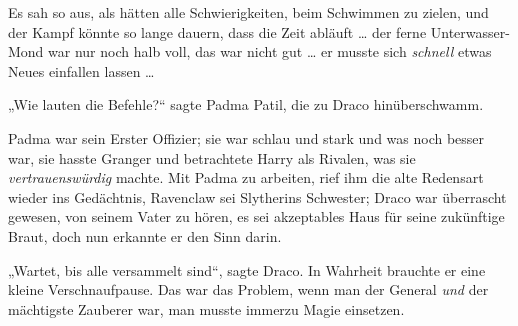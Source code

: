 Es sah so aus, als hätten alle Schwierigkeiten, beim Schwimmen zu zielen, und der Kampf könnte so lange dauern, dass die Zeit abläuft … der ferne Unterwasser-Mond war nur noch halb voll, das war nicht gut … er musste sich \emph{schnell} etwas Neues einfallen lassen …

„Wie lauten die Befehle?“ sagte Padma Patil, die zu Draco hinüberschwamm.

Padma war sein Erster Offizier; sie war schlau und stark und was noch besser war, sie hasste Granger und betrachtete Harry als Rivalen, was sie \emph{vertrauenswürdig} machte. Mit Padma zu arbeiten, rief ihm die alte Redensart wieder ins Gedächtnis, Ravenclaw sei Slytherins Schwester; Draco war überrascht gewesen, von seinem Vater zu hören, es sei akzeptables Haus für seine zukünftige Braut, doch nun erkannte er den Sinn darin.

„Wartet, bis alle versammelt sind“, sagte Draco. In Wahrheit brauchte er eine kleine Verschnaufpause. Das war das Problem, wenn man der General \emph{und} der mächtigste Zauberer war, man musste immerzu Magie einsetzen.

